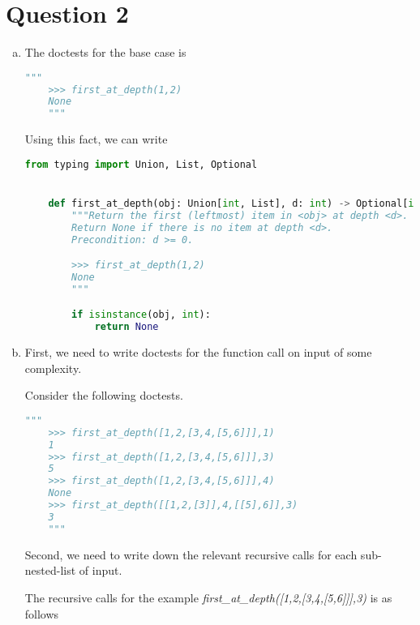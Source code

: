 \documentclass[12pt]{article}
\begin{document}
\section*{Question 2}
\begin{enumerate}[a.]
    \item The doctests for the base case is

    \begin{lstlisting}[language=python]
    """
    >>> first_at_depth(1,2)
    None
    """
    \end{lstlisting}

    \bigskip

    Using this fact, we can write

    \begin{lstlisting}[language=python,caption={worksheet\_16\_q2a\_solution}]
    from typing import Union, List, Optional


    def first_at_depth(obj: Union[int, List], d: int) -> Optional[int]:
        """Return the first (leftmost) item in <obj> at depth <d>.
        Return None if there is no item at depth <d>.
        Precondition: d >= 0.

        >>> first_at_depth(1,2)
        None
        """

        if isinstance(obj, int):
            return None
    \end{lstlisting}

    \item

    \bigskip

    First, we need to write doctests for the function call on input of some complexity.

    \bigskip

    Consider the following doctests.

    \begin{lstlisting}[language=python]
    """
    >>> first_at_depth([1,2,[3,4,[5,6]]],1)
    1
    >>> first_at_depth([1,2,[3,4,[5,6]]],3)
    5
    >>> first_at_depth([1,2,[3,4,[5,6]]],4)
    None
    >>> first_at_depth([[1,2,[3]],4,[[5],6]],3)
    3
    """
    \end{lstlisting}

    \bigskip

    Second, we need to write down the relevant recursive calls for each sub-nested-list of input.

    \bigskip

    The recursive calls for the example \textit{first\_at\_depth([1,2,[3,4,[5,6]]],3)}
    is as follows


\end{enumerate}
\end{document}
